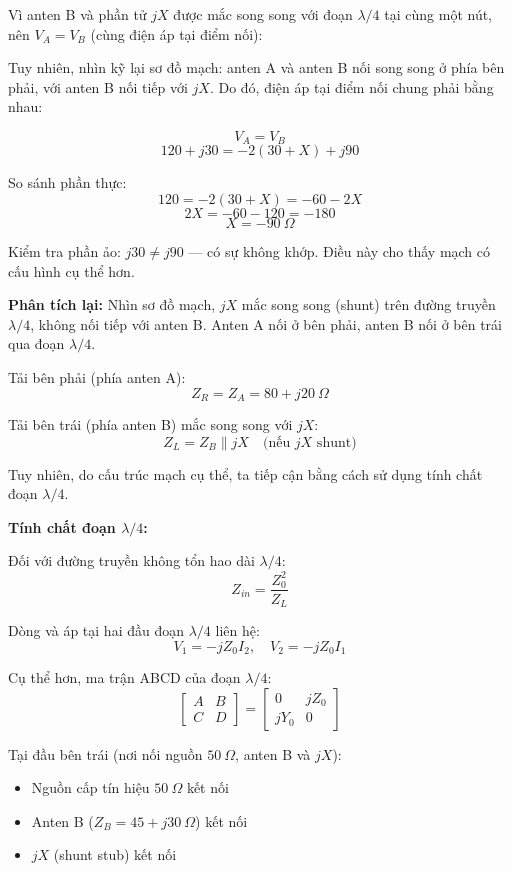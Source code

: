 \documentclass[12pt,a4paper]{article}
\begin{document}
Vì anten B và phần tử $jX$ được mắc song song với đoạn $\lambda/4$ tại cùng một nút, nên $V_A = V_B$ (cùng điện áp tại điểm nối):

Tuy nhiên, nhìn kỹ lại sơ đồ mạch: anten A và anten B nối song song ở phía bên phải, với anten B nối tiếp với $jX$. Do đó, điện áp tại điểm nối chung phải bằng nhau:

\[
V_A = V_B
\]
\[
120 + j30 = -2(30 + X) + j90
\]

So sánh phần thực:
\[
120 = -2(30 + X) = -60 - 2X
\]
\[
2X = -60 - 120 = -180
\]
\[
\boxed{X = -90~\Omega}
\]

Kiểm tra phần ảo: $j30 \neq j90$ — có sự không khớp. Điều này cho thấy mạch có cấu hình cụ thể hơn.

\textbf{Phân tích lại:} Nhìn sơ đồ mạch, $jX$ mắc song song (shunt) trên đường truyền $\lambda/4$, không nối tiếp với anten B. Anten A nối ở bên phải, anten B nối ở bên trái qua đoạn $\lambda/4$.

Tải bên phải (phía anten A):
\[
Z_R = Z_A = 80 + j20~\Omega
\]

Tải bên trái (phía anten B) mắc song song với $jX$:
\[
Z_L = Z_B \| jX \quad \text{(nếu $jX$ shunt)}
\]

Tuy nhiên, do cấu trúc mạch cụ thể, ta tiếp cận bằng cách sử dụng tính chất đoạn $\lambda/4$.

\textbf{Tính chất đoạn $\lambda/4$:}

Đối với đường truyền không tổn hao dài $\lambda/4$:
\[
Z_{in} = \frac{Z_0^2}{Z_L}
\]

Dòng và áp tại hai đầu đoạn $\lambda/4$ liên hệ:
\[
V_1 = -jZ_0 I_2, \quad V_2 = -jZ_0 I_1
\]

Cụ thể hơn, ma trận ABCD của đoạn $\lambda/4$:
\[
\begin{bmatrix} A & B \\ C & D \end{bmatrix} = \begin{bmatrix} 0 & jZ_0 \\ jY_0 & 0 \end{bmatrix}
\]

Tại đầu bên trái (nơi nối nguồn $50~\Omega$, anten B và $jX$):
\begin{itemize}
    \item Nguồn cấp tín hiệu $50~\Omega$ kết nối
    \item Anten B ($Z_B = 45 + j30~\Omega$) kết nối
    \item $jX$ (shunt stub) kết nối
\end{itemize}
\end{document}
